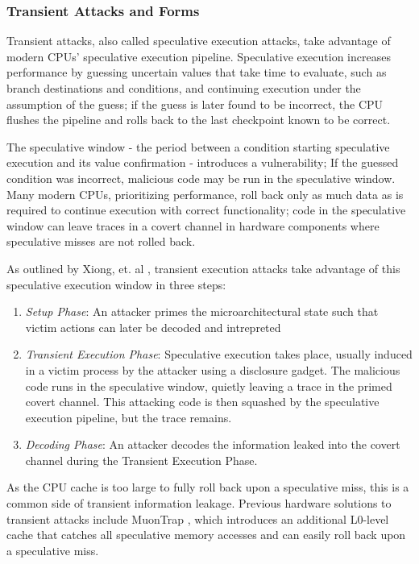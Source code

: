 \documentclass[letterpaper]{article}
\begin{document}
\subsubsection{Transient Attacks and Forms}
Transient attacks, also called speculative execution attacks, take advantage of modern CPUs' speculative execution pipeline.
Speculative execution increases performance by guessing uncertain values that take time to evaluate, such as branch destinations
and conditions, and continuing execution under the assumption of the guess;
if the guess is later found to be incorrect, the CPU flushes the pipeline and rolls back to the last checkpoint known to be correct.

The speculative window - the period between a condition starting speculative execution and its value confirmation -
introduces a vulnerability;
If the guessed condition was incorrect, malicious code may be run in the speculative window.
Many modern CPUs, prioritizing performance, roll back only as much data as is required to continue execution
with correct functionality; code in the speculative window can leave traces in a covert channel in hardware
components where speculative misses are not rolled back.

As outlined by Xiong, et. al \cite{TransientAttackSurvey}, transient execution attacks take advantage of this speculative execution window in three steps:
\begin{enumerate}
    \item \textit{Setup Phase}:
An attacker primes the microarchitectural state such that victim actions can later be decoded and intrepreted
    \item \textit{Transient Execution Phase}:
Speculative execution takes place, usually induced in a victim process by the attacker using a disclosure gadget.
The malicious code runs in the speculative window, quietly leaving a trace in the primed covert channel.
This attacking code is then squashed by the speculative execution pipeline, but the trace remains.
    \item \textit{Decoding Phase}:
An attacker decodes the information leaked into the covert channel during the Transient Execution Phase.
\end{enumerate}

As the CPU cache is too large to fully roll back upon a speculative miss, this is a common side of transient information leakage.
Previous hardware solutions to transient attacks include MuonTrap \cite{MuonTrap},
which introduces an additional L0-level cache that catches all speculative memory accesses
and can easily roll back upon a speculative miss.
\end{document}
